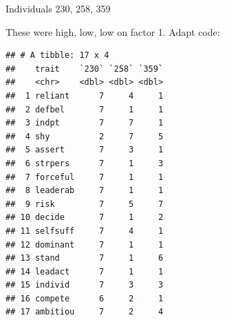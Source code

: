 \documentclass[ignorenonframetext,]{beamer}
\newenvironment{Shaded}{\begin{snugshade}}{\end{snugshade}}
\newcommand{\DataTypeTok}[1]{\textcolor[rgb]{0.13,0.29,0.53}{#1}}
\newcommand{\DecValTok}[1]{\textcolor[rgb]{0.00,0.00,0.81}{#1}}
\newcommand{\FloatTok}[1]{\textcolor[rgb]{0.00,0.00,0.81}{#1}}
\newcommand{\KeywordTok}[1]{\textcolor[rgb]{0.13,0.29,0.53}{\textbf{#1}}}
\newcommand{\NormalTok}[1]{#1}
\newcommand{\OperatorTok}[1]{\textcolor[rgb]{0.81,0.36,0.00}{\textbf{#1}}}
\newcommand{\StringTok}[1]{\textcolor[rgb]{0.31,0.60,0.02}{#1}}
\begin{document}
\begin{frame}[fragile]{Individuals 230, 258, 359}
\protect\hypertarget{individuals-230-258-359}{}

These were high, low, low on factor 1. Adapt code:

\tiny

\begin{Shaded}
\end{Shaded}

\begin{verbatim}
## # A tibble: 17 x 4
##    trait    `230` `258` `359`
##    <chr>    <dbl> <dbl> <dbl>
##  1 reliant      7     4     1
##  2 defbel       7     1     1
##  3 indpt        7     7     1
##  4 shy          2     7     5
##  5 assert       7     3     1
##  6 strpers      7     1     3
##  7 forceful     7     1     1
##  8 leaderab     7     1     1
##  9 risk         7     5     7
## 10 decide       7     1     2
## 11 selfsuff     7     4     1
## 12 dominant     7     1     1
## 13 stand        7     1     6
## 14 leadact      7     1     1
## 15 individ      7     3     3
## 16 compete      6     2     1
## 17 ambitiou     7     2     4
\end{verbatim}

\normalsize

\end{frame}
\end{document}
